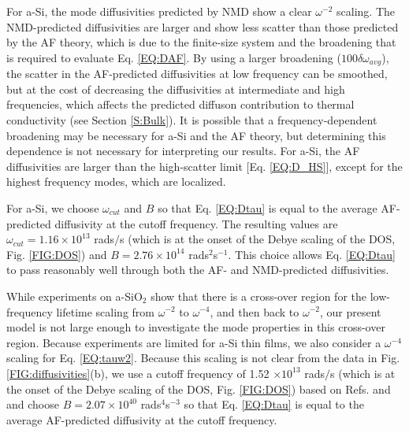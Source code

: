 \documentclass[aps,prb,twocolumn,superscriptaddress,footinbib,amsmath,amssymb,floatfix]{revtex4}
\begin{document}
For a-Si, the mode diffusivities predicted by NMD 
show a clear $\omega^{-2}$ scaling. 
The NMD-predicted diffusivities are larger and show less 
scatter than those predicted by the AF theory, which is due to 
the finite-size system and the broadening that is 
required to evaluate 
Eq. \eqref{EQ:DAF}.\cite{feldman_thermal_1993} By using a larger 
broadening ($100\delta\omega_{avg}$), the scatter 
in the AF-predicted 
diffusivities at low frequency can be smoothed, but at the cost of 
decreasing the diffusivities at intermediate and 
high frequencies, which 
affects the predicted diffuson contribution to thermal 
conductivity (see Section \ref{S:Bulk}). 
It is possible that a frequency-dependent broadening may be 
necessary for a-Si and the AF theory,  
but determining this dependence is not necessary for 
interpreting our results. 
For a-Si, the AF diffusivities are 
larger than the high-scatter limit [Eq. \eqref{EQ:D_HS}], 
except for the highest frequency modes, which are localized.
\cite{feldman_thermal_1993} 

For a-Si, we choose $\omega_{cut}$  
and $B$ so that Eq. \eqref{EQ:Dtau} is equal 
to the average AF-predicted diffusivity at the cutoff frequency. 
The resulting values are 
$\omega_{cut}=1.16 \times 10^{13}$ rads$/$s (which is at the onset 
of the Debye scaling of the DOS, Fig. \ref{FIG:DOS})  
and $B=2.76\times10^{14}$ rads$^2$s$^{-1}$. This choice 
allows Eq. \eqref{EQ:Dtau} to pass reasonably well through both 
the AF- and NMD-predicted diffusivities. 

While experiments on a-SiO$_2$ show that there is a cross-over 
region for the low-frequency lifetime scaling from $\omega^{-2}$ to 
$\omega^{-4}$,\cite{masciovecchio_evidence_2006} 
and then back to $\omega^{-2}$,
\cite{masciovecchio_evidence_2006,baldi_sound_2010,
baldi_elastic_2011,baldi_emergence_2013} our present model is not 
large enough to investigate the mode properties 
in this cross-over region. 
Because experiments are limited for a-Si thin films, 
\cite{hondongwa_ultrasonic_2011} 
we also consider a $\omega^{-4}$ scaling 
for Eq. \eqref{EQ:tauw2}. Because this scaling is not clear from 
the data in Fig. \ref{FIG:diffusivities}(b),  
we use a cutoff frequency of 1.52 $\times 10^{13}$ rads$/$s 
(which is at the onset 
of the Debye scaling of the DOS, Fig. \ref{FIG:DOS}) 
based on Refs.  and 
and choose $B=2.07\times10^{40}$ rads$^4$s$^{-3}$ so that 
Eq. \eqref{EQ:Dtau} is equal to the average 
AF-predicted diffusivity at the cutoff frequency. 
\end{document}
